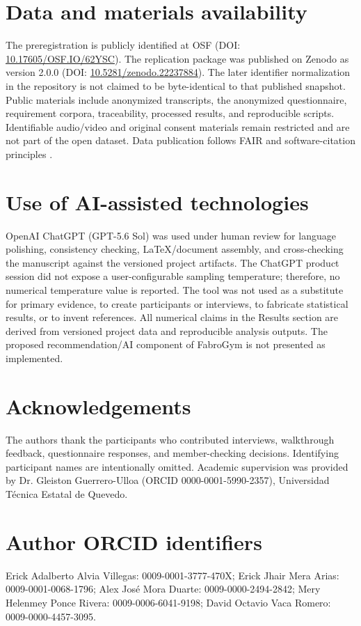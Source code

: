 \documentclass[pdflatex,sn-basic]{sn-jnl}
\begin{document}
\section*{Data and materials availability}
The preregistration is publicly identified at OSF (DOI: \href{https://doi.org/10.17605/OSF.IO/62YSC}{10.17605/OSF.IO/62YSC}). The replication package was published on Zenodo as version 2.0.0 (DOI: \href{https://doi.org/10.5281/zenodo.22237884}{10.5281/zenodo.22237884}). The later identifier normalization in the repository is not claimed to be byte-identical to that published snapshot. Public materials include anonymized transcripts, the anonymized questionnaire, requirement corpora, traceability, processed results, and reproducible scripts. Identifiable audio/video and original consent materials remain restricted and are not part of the open dataset. Data publication follows FAIR and software-citation principles \cite{wilkinson2016,smith2016,dicosmo2020}.

\section*{Use of AI-assisted technologies}
OpenAI ChatGPT (GPT-5.6 Sol) was used under human review for language polishing, consistency checking, LaTeX/document assembly, and cross-checking the manuscript against the versioned project artifacts. The ChatGPT product session did not expose a user-configurable sampling temperature; therefore, no numerical temperature value is reported. The tool was not used as a substitute for primary evidence, to create participants or interviews, to fabricate statistical results, or to invent references. All numerical claims in the Results section are derived from versioned project data and reproducible analysis outputs. The proposed recommendation/AI component of FabroGym is not presented as implemented.

\section*{Acknowledgements}
The authors thank the participants who contributed interviews, walkthrough feedback, questionnaire responses, and member-checking decisions. Identifying participant names are intentionally omitted. Academic supervision was provided by Dr. Gleiston Guerrero-Ulloa (ORCID 0000-0001-5990-2357), Universidad T{\'e}cnica Estatal de Quevedo.

\section*{Author ORCID identifiers}
Erick Adalberto Alvia Villegas: 0009-0001-3777-470X; Erick Jhair Mera Arias: 0009-0001-0068-1796; Alex Jos{\'e} Mora Duarte: 0009-0000-2494-2842; Mery Helenmey Ponce Rivera: 0009-0006-6041-9198; David Octavio Vaca Romero: 0009-0000-4457-3095.
\end{document}
